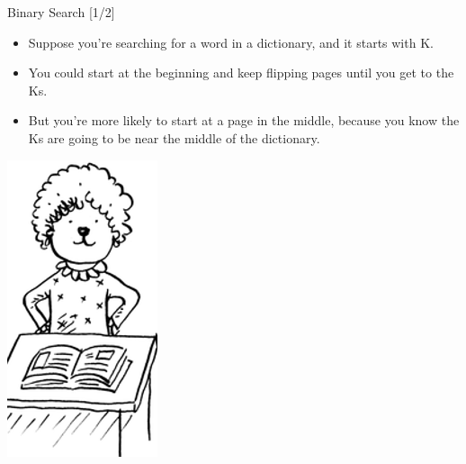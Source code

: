 \documentclass[ignorenonframetext,]{beamer}
\providecommand{\tightlist}{%
  \setlength{\itemsep}{0pt}\setlength{\parskip}{0pt}}
\begin{document}
\begin{frame}{Binary Search {[}1/2{]}}
\protect\hypertarget{binary-search-12}{}

\begin{itemize}
\tightlist
\item
  Suppose you're searching for a word in a dictionary, and it starts
  with K.
\item
  You could start at the beginning and keep flipping pages until you get
  to the Ks.
\item
  But you're more likely to start at a page in the middle, because you
  know the Ks are going to be near the middle of the dictionary.
\end{itemize}

\includegraphics{./Chapter01-figure/dictionary_serach.png}

\end{frame}
\end{document}
